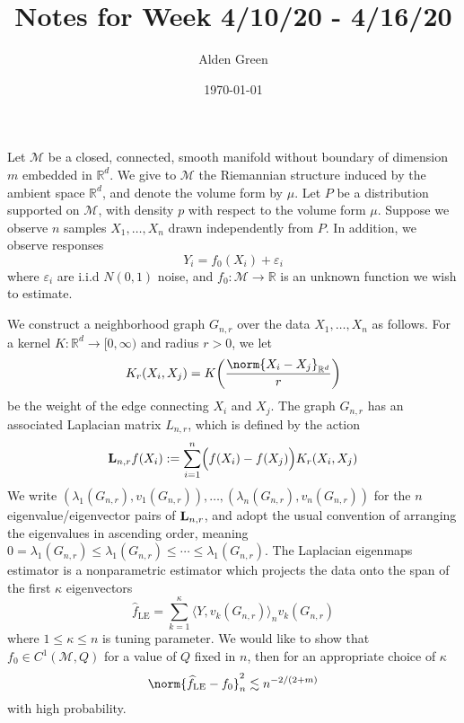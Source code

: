 \documentclass{article}
\newcommand{\Reals}{\mathbb{R}}
\newcommand{\1}{\mathbf{1}}
\newcommand{\Rd}{\Reals^d}
\newcommand{\Lap}{{\bf L}}
\newcommand{\dotp}[2]{\langle #1, #2 \rangle}
\newcommand{\wh}[1]{\widehat{#1}}
\newcommand{\mc}[1]{\mathcal{#1}}
\newcommand{\LE}{\mathrm{LE}}
\theoremstyle{alden}
\theoremstyle{aldenthm}
\theoremstyle{definition}
\theoremstyle{remark}
\begin{document}
\title{Notes for Week 4/10/20 - 4/16/20}
\author{Alden Green}
\date{\today}
\maketitle

Let $\mc{M}$ be a closed, connected, smooth manifold without boundary of dimension $m$ embedded in $\Rd$. We give to $\mc{M}$ the Riemannian structure induced by the ambient space $\Rd$, and denote the volume form by $\mu$.  Let $P$ be a distribution supported on $\mc{M}$, with density $p$ with respect to the volume form $\mu$. Suppose we observe $n$ samples $X_1, \ldots, X_n$ drawn independently from $P$. In addition, we observe responses
\begin{equation*}
Y_i = f_0(X_i) + \varepsilon_i
\end{equation*}
where $\varepsilon_i$ are i.i.d $N(0,1)$ noise, and $f_0:\mc{M} \to \Reals$ is an unknown function we wish to estimate.

We construct a neighborhood graph $G_{n,r}$ over the data $X_1,\ldots,X_n$ as follows. For a kernel $K: \Rd \to [0,\infty)$ and radius $r > 0$, we let
\begin{equation*}
K_r(X_i,X_j) = K\biggl(\frac{\norm{X_i - X_j}_{\Rd}}{r}\biggr)
\end{equation*}
be the weight of the edge connecting $X_i$ and $X_j$. The graph $G_{n,r}$ has an associated Laplacian matrix $L_{n,r}$, which is defined by the action
\begin{equation*}
\Lap_{n,r}f(X_i) := \sum_{i = 1}^{n} \Bigl(f(X_i) - f(X_j)\Bigr) K_r(X_i,X_j)
\end{equation*}
We write $(\lambda_1(G_{n,r}),v_1(G_{n,r})),\ldots,(\lambda_n(G_{n,r}), v_n(G_{n,r}))$ for the $n$ eigenvalue/eigenvector pairs of $\Lap_{n,r}$, and adopt the usual convention of arranging the eigenvalues in ascending order, meaning $0 = \lambda_1(G_{n,r}) \leq \lambda_1(G_{n,r}) \leq \cdots \leq \lambda_1(G_{n,r})$. The Laplacian eigenmaps estimator is a nonparametric estimator which projects the data onto the span of the first $\kappa$ eigenvectors
\begin{equation*}
\wh{f}_{\LE} = \sum_{k = 1}^{\kappa} \dotp{Y}{v_k(G_{n,r})}_n v_k(G_{n,r})
\end{equation*}
where $1 \leq \kappa \leq n$ is tuning parameter. We would like to show that $f_0 \in C^1(\mc{M},Q)$ for a value of $Q$ fixed in $n$, then for an appropriate choice of $\kappa$
\begin{equation*}
\norm{\wh{f}_{\LE} - f_0}_n^2 \lesssim n^{-2/(2+m)}
\end{equation*}
with high probability. 
\end{document}
